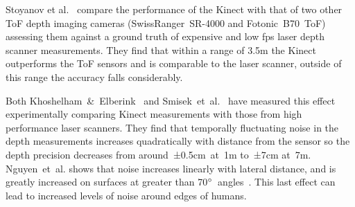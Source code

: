 \documentclass[11pt]{article} %
\begin{document}
Stoyanov et al.~\cite{StoyanovTodorandLouloudiAthanasiaandAndreassonHenrikandLilienthal2011a} compare the performance of the Kinect with that of two other ToF depth imaging cameras (SwissRanger~SR-4000 and Fotonic~B70~ToF) assessing them against a ground truth of expensive and low fps laser depth scanner measurements. They find that within a range of 3.5m the Kinect outperforms the ToF sensors and is comparable to the laser scanner, outside of this range the accuracy falls considerably.

Both Khoshelham~\&~Elberink~\cite{Khoshelham2012a} and Smisek~et~al.~\cite{Smisek2011} have measured this effect experimentally comparing Kinect measurements with those from high performance laser scanners. They find that temporally fluctuating noise in the depth measurements increases quadratically with distance from the sensor so the depth precision decreases from around~±0.5cm~at~1m to~±7cm at~7m. Nguyen~et~al. shows that noise increases linearly with lateral distance, and is greatly increased on surfaces at greater than 70$\degree$~angles~\cite{Nguyen2012}. This last effect can lead to increased levels of noise around edges of humans. 
\end{document}
